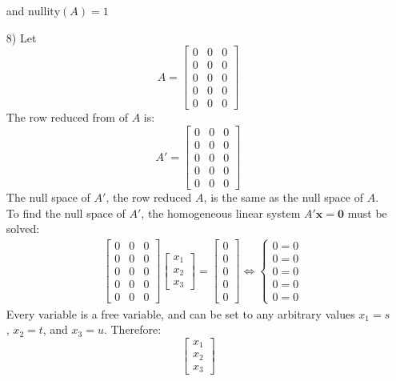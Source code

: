 \documentclass{article}
\begin{document}
\begin{itemize}
and \(\text{nullity}(A) = 1\)
\item[8)] Let \[A = \begin{bmatrix}
0 & 0 & 0 \\ 
0 & 0 & 0 \\ 
0 & 0 & 0 \\ 
0 & 0 & 0 \\ 
0 & 0 & 0 
\end{bmatrix}\]
The row reduced from of \(A\) is: 
\[A' = \begin{bmatrix}
0 & 0 & 0 \\ 
0 & 0 & 0 \\ 
0 & 0 & 0 \\ 
0 & 0 & 0 \\ 
0 & 0 & 0 
\end{bmatrix}\]
The null space of \(A'\), the row reduced \(A\), is the same as the null space of \(A\). To find the null space of \(A'\), the homogeneous linear system \(A'\mathbf{x} = \mathbf{0}\) must be solved:
\begin{align*}
& \begin{bmatrix}
0 & 0 & 0 \\ 
0 & 0 & 0 \\ 
0 & 0 & 0 \\ 
0 & 0 & 0 \\ 
0 & 0 & 0 
\end{bmatrix}\begin{bmatrix} x_1 \\ x_2 \\ x_3 \end{bmatrix} = \begin{bmatrix} 0 \\ 0 \\ 0 \\ 0 \\ 0 \end{bmatrix} 
\iff \left\{\begin{array}{c} 
0 = 0 \\ 
0 = 0 \\
0 = 0 \\
0 = 0 \\ 
0 = 0
\end{array}\right.
\end{align*}
Every variable is a free variable, and can be set to any arbitrary values \(x_1 = s\), \(x_2 = t\), and \(x_3 = u\). Therefore:
\[\begin{bmatrix} x_1 \\ x_2 \\ x_3 \end{bmatrix} 
\]
\end{itemize}
\end{document}
